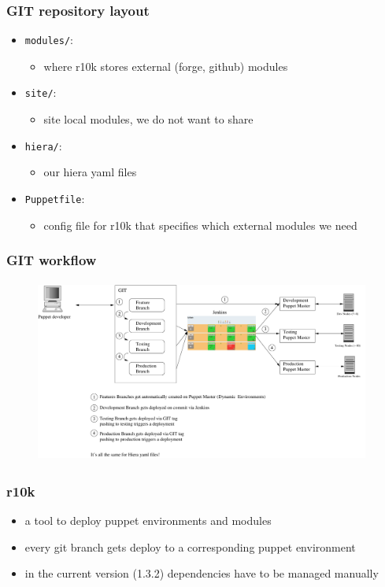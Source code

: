 \documentclass{beamer}
\begin{document}
\begin{frame}
  \frametitle{GIT repository layout}

  \begin{itemize}
  \item \texttt{modules/}:
    \begin{itemize}
    \item where r10k stores external (forge, github) modules
    \end{itemize}
  \item \texttt{site/}:
    \begin{itemize}
    \item site local modules, we do not want to share
    \end{itemize}
  \item \texttt{hiera/}:
    \begin{itemize}
    \item our hiera yaml files
    \end{itemize}
  \item \texttt{Puppetfile}:
    \begin{itemize}
    \item config file for r10k that specifies which external modules we need
    \end{itemize}
  \end{itemize}
\end{frame}


\begin{frame}
  \frametitle{GIT workflow}
  \begin{figure}
    \centering
      \includegraphics[height=6cm,width=11cm]{../pics/puppet_deployment2}
    \label{fig:stack}
  \end{figure}

\end{frame}

\begin{frame}
  \frametitle{r10k}

  \begin{itemize}
  \item a tool to deploy puppet environments and modules
  \item every git branch gets deploy to a corresponding puppet environment
  \item in the current version (1.3.2) dependencies have to be managed
    manually
  \end{itemize}
\end{frame}
\end{document}
